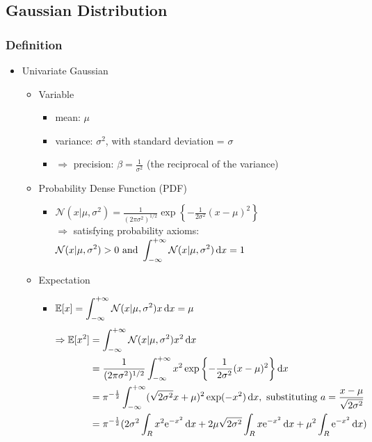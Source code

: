 \subsection{Gaussian Distribution}
 
\subsubsection{Definition}
\begin{itemize}
\item Univariate Gaussian
	\begin{itemize}
	\item Variable
		\begin{itemize}
		\item mean: $\mu$
		\item variance: $\sigma^2$, with standard deviation = $\sigma$ 
		\item $\Rightarrow$ precision: $\beta = \frac 1 {\sigma^2}$ (the reciprocal of the variance)
		\end{itemize}
	\item Probability Dense Function (PDF)
		\begin{itemize}
		\item $\displaystyle \mathcal N(x|\mu, \sigma^2) = \frac 1 {(2\pi \sigma^2)^{1/2}} \exp \left\{ -\frac 1 {2\sigma^2}(x-\mu)^2 \right\}$ \\
		$\Rightarrow$ satisfying probability axioms: $\displaystyle \mathcal N(x|\mu,\sigma^2)>0 \text{ and } \int_{-\infty}^{+\infty} \mathcal N (x|\mu,\sigma^2) \mathop{}\!\mathrm{d} x = 1$
		\end{itemize}
	\item Expectation
		\begin{itemize}
		\item $\displaystyle \mathbb{E}[x] = \int_{-\infty}^{+\infty}\mathcal{N}(x|\mu, \sigma^2)x\mathop{}\!\mathrm{d} x=\mu$
		\begin{align*}
		\Rightarrow \displaystyle \mathbb E [x^2] &= \int_{-\infty}^{+\infty} \mathcal{N}(x|\mu, \sigma^2)x^2\D x \\ 
		&= \frac 1 {(2\pi \sigma^2)^{1/2}} \int_{-\infty}^{+\infty} x^2 \exp \left\{ -\frac 1 {2\sigma^2}(x-\mu)^2 \right\} \D x \\ 
		&= \pi^{-\frac 12} \int_{-\infty}^{+\infty} (\sqrt{2\sigma^2}x+\mu)^2 \exp(-x^2) \D x, \text{ substituting } a=\frac{x-\mu}{\sqrt{2\sigma^2}} \\ 
		&= \pi^{-\frac 12} (2\sigma^2\int_R x^2 {\rm e}^{-x^2}\D x + 2\mu\sqrt{2\sigma^2}\int_R x {\rm e}^{-x^2}\D x + \mu^2 \int_R {\rm e}^{-x^2}\D x ) \\ 

\end{align*}
\end{itemize}
\end{itemize}
\end{itemize}
